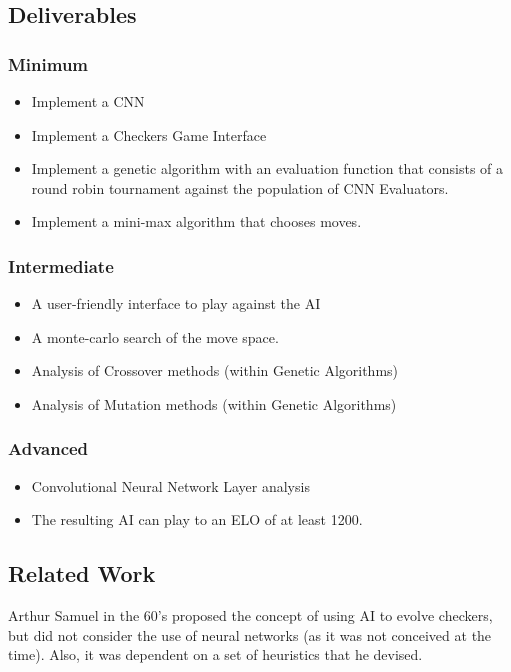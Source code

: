 \documentclass[12pt,a4paper]{article}
\begin{document}
\subsection*{Deliverables}

\subsubsection*{Minimum}

\begin{itemize}
\item Implement a CNN
\item Implement a Checkers Game Interface
\item Implement a genetic algorithm with an evaluation function that
  consists of a round robin tournament against the population of CNN
  Evaluators.
\item Implement a mini-max algorithm that chooses moves.
\end{itemize}

\subsubsection*{Intermediate}

\begin{itemize}
\item A user-friendly interface to play against the AI
\item A monte-carlo search of the move space.
\item Analysis of Crossover methods (within Genetic Algorithms)
\item Analysis of Mutation methods (within Genetic Algorithms)
\end{itemize}

\subsubsection*{Advanced}

\begin{itemize}
\item Convolutional Neural Network Layer analysis
\item The resulting AI can play to an ELO of at least 1200.
\end{itemize}

\subsection*{Related Work}
Arthur Samuel in the 60's proposed the concept of using AI to evolve checkers, but did not consider the use of neural networks (as it was not conceived at the time). Also, it was dependent on a set of heuristics that he devised. 
\end{document}
